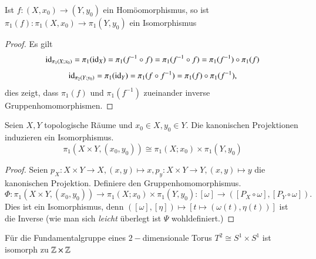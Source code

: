 \documentclass[a4paper,10pt]{scrartcl}
\newcommand{\homo}{\cong}
\begin{document}
\begin{kor}
 Ist $f:(X, x_0)\to (Y, y_0)$ ein Homöomorphismus, so ist $\pi_1(f):\pi_1(X,x_0) \to \pi_1(Y,y_0)$ ein Isomorphismus
\end{kor}
\begin{proof}
 Es gilt 
\[
\operatorname{id}_{\pi_1(X; x_0)}= \pi_1(\operatorname{id}_X)=\pi_1(f^{-1}\circ f)=\pi_1(f^{-1} \circ f)=\pi_1(f^{-1})\circ \pi_1(f)
\]
\[
 \operatorname{id}_{\pi_2(Y;y_0)}=\pi_1(\operatorname{id}_Y)=\pi_1(f\circ f^{-1})=\pi_1(f) \circ \pi_1(f^{-1}),
\]
dies zeigt, dass $\pi_1(f)$ und $\pi_1(f^{-1})$ zueinander inverse Gruppenhomomorphismen.
\end{proof}
\begin{st}
 Seien $X,Y$ topologische Räume und $x_0\in X, y_0\in Y$. Die kanonischen Projektionen induzieren ein Isomorphismus.
\[
 \pi_1(X\times Y, (x_0, y_0)) \homo \pi_1(X;x_0) \times \pi_1(Y, y_0)
\]
\end{st}
\begin{proof}
 Seien $p_X: X\times Y \to X, (x,y) \mapsto x, p_y: X\times Y \to Y, (x,y) \mapsto y$ die kanonischen Projektion. Definiere den Gruppenhomomorphismus.
\[
 \Phi: \pi_1(X\times Y, (x_0, y_0)) \to \pi_1(X;x_0)\times \pi_1(Y,y_0): [\omega] \to ([P_X\circ \omega], [P_Y \circ \omega]).
\]
Dies ist ein Isomorphismus, denn $([\omega],[\eta])\mapsto [t\mapsto (\omega(t), \eta(t))]$ ist die Inverse (wie man sich \emph{leicht} überlegt ist $\Psi$ wohldefiniert.)
\end{proof}
\begin{kor}
 Für die Fundamentalgruppe eines $2-$dimensionale Torus $T^2 \homo S^1 \times S^1$ ist isomorph zu $\mathbb{Z}\times \mathbb{Z}$


\end{kor}




 
 
\end{document}
